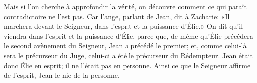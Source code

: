 Mais si l’on cherche à approfondir la vérité,
	on découvre comment ce qui paraît contradictoire ne l’est pas.
Car l’ange, parlant de Jean, dit à Zacharie:
	«Il marchera devant le Seigneur, dans l’esprit et la puissance d’Élie.»
On dit qu’il viendra dans l’esprit et la puissance d’Élie,
	parce que, de même qu’Élie précédera le second avènement du Seigneur,
	Jean a précédé le premier;
	et, comme celui-là sera le précurseur du Juge,
	celui-ci a été le précurseur du Rédempteur.
Jean était donc Élie en esprit;
	il ne l’était pas en personne.
Ainsi ce que le Seigneur affirme de l’esprit,
	Jean le nie de la personne.
